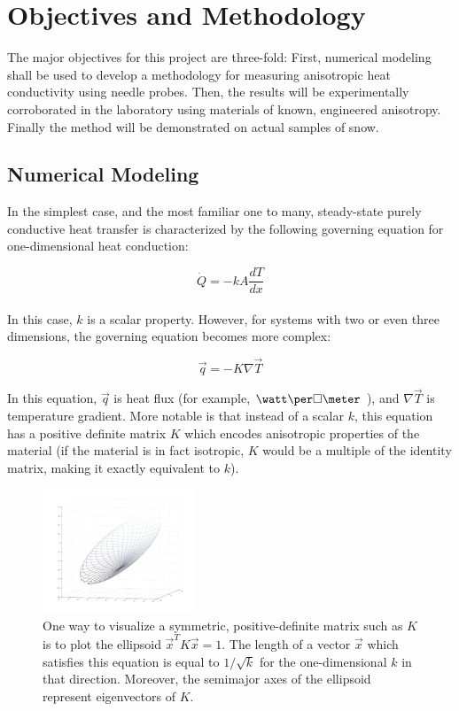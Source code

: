 \documentclass[12pt, letterpaper]{article}
\begin{document}
\section{Objectives and Methodology}

The major objectives for this project are three-fold:  First, numerical modeling shall be used to develop a methodology for measuring anisotropic heat conductivity using needle probes. Then, the results will be experimentally corroborated in the laboratory using materials of known, engineered anisotropy. Finally the method will be demonstrated on actual samples of snow.

\subsection{Numerical Modeling}

In the simplest case, and the most familiar one to many, steady-state purely conductive heat transfer is characterized by the following governing equation for one-dimensional heat conduction:

\begin{equation*}
\dot{Q}=-kA\frac{dT}{dx}
\end{equation*}\\

In this case, \(k\) is a scalar property. However, for systems with two or even three dimensions, the governing equation becomes more complex:

\begin{equation*}
\vec{q}=-K \nabla \vec{T}
\end{equation*}

In this equation, \(\vec{q}\) is heat flux (for example, \(\watt \per \square \meter\) ), and \(\nabla \vec{T}\) is temperature gradient. More notable is that instead of a scalar \(k\), this equation has a positive definite matrix \(K\) which encodes anisotropic properties of the material (if the material is in fact isotropic, \(K\) would be a multiple of the identity matrix, making it exactly equivalent to \(k\)).

\begin{figure}
\centering
\label{fig:m_ellipsoid}
\includegraphics[width=0.4\textwidth]{m_ellipsoid}
\caption{One way to visualize a symmetric, positive-definite matrix such as \(K\) is to plot the ellipsoid \(\vec{x}^TK\vec{x}=1\). The length of a vector \(\vec{x}\) which satisfies this equation is equal to \(1/\sqrt{k}\) for the one-dimensional \(k\) in that direction. Moreover, the semimajor axes of the ellipsoid represent eigenvectors of \(K\). }
\vspace{-72pt}
\end{figure}
\end{document}
